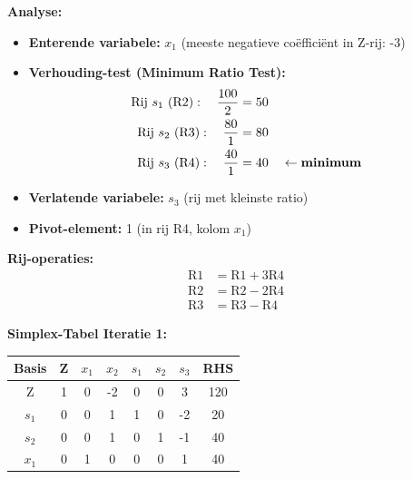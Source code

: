 \documentclass[a4paper,11pt]{article}
\begin{document}
\begin{oefenblok}
    \textbf{Analyse:}
    \begin{itemize}
        \item \textbf{Enterende variabele:} $x_1$ (meeste negatieve coëfficiënt in Z-rij: -3)
        \item \textbf{Verhouding-test (Minimum Ratio Test):}
              \begin{align*}
                  \text{Rij } s_1 \text{ (R2)}: \quad \frac{100}{2} & = 50                                          \\
                  \text{Rij } s_2 \text{ (R3)}: \quad \frac{80}{1}  & = 80                                          \\
                  \text{Rij } s_3 \text{ (R4)}: \quad \frac{40}{1}  & = 40 \quad \leftarrow \text{\textbf{minimum}}
              \end{align*}
        \item \textbf{Verlatende variabele:} $s_3$ (rij met kleinste ratio)
        \item \textbf{Pivot-element:} 1 (in rij R4, kolom $x_1$)
    \end{itemize}

    \textbf{Rij-operaties:}
    \begin{align*}
        \text{R1} & = \text{R1} + 3 \text{R4} \\
        \text{R2} & = \text{R2} - 2 \text{R4} \\
        \text{R3} & = \text{R3} - \text{R4}
    \end{align*}

    \vspace{0.3cm}

    \textbf{Simplex-Tabel Iteratie 1:}

    \vspace{0.3cm}

    \begin{center}
        \begin{tabular}{|c|c|c|c|c|c|c|c|}
            \hline
            \textbf{Basis} & \textbf{Z} & \textbf{$x_1$} & \textbf{$x_2$} & \textbf{$s_1$} & \textbf{$s_2$} & \textbf{$s_3$} & \textbf{RHS} \\
            \hline
            Z              & 1          & 0              & -2             & 0              & 0              & 3              & 120          \\
            \hline
            $s_1$          & 0          & 0              & 1              & 1              & 0              & -2             & 20           \\
            \hline
            $s_2$          & 0          & 0              & 1              & 0              & 1              & -1             & 40           \\
            \hline
            $x_1$          & 0          & 1              & 0              & 0              & 0              & 1              & 40           \\
            \hline
        \end{tabular}
    \end{center}
    \FloatBarrier


\end{oefenblok}
\end{document}

